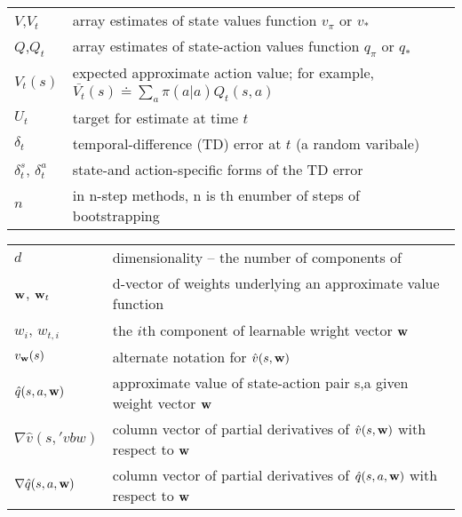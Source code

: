 \documentclass[10pt, landscape, a4paper]{article}
\begin{document}
\begin{multicols}{3}
        \begin{tabular}{ p{} p{} }
            $V$,$V_t$                  & array estimates of state values function $v_\pi$ or $v_*$                                      \\
            $Q$,$Q_t$                  & array estimates of state-action values function $q_\pi$ or $q_*$                               \\
            $V_t(s)$                   & expected approximate action value; for example, $\bar{V_t}(s)\doteq \sum_{a} \pi(a|a)Q_t(s,a)$ \\
            $U_t$                      & target for estimate at time $t$                                                                \\
            $\delta_t$                 & temporal-difference (TD) error at $t$ (a random varibale)                                      \\
            $\delta_t^s$, $\delta_t^a$ & state-and action-specific forms of the TD error                                                \\
            $n$                        & in n-step methods, n is th enumber of steps of bootstrapping                                   \\
        \end{tabular}

        \begin{tabular}{ p{} p{} }
            $d$                          & dimensionality -- the number of components of                                          \\
            $\vb{w}$, $\vb{w}_t$         & d-vector of weights underlying an approximate value function                           \\
            $w_i$, $w_{t,i}$             & the $i$th component of learnable wright vector $\vb{w}$                                \\
            $v_{\vb{w}}(s)$              & alternate notation for $\hat{v}(s,\vb{w})$                                             \\
            $\hat{q}(s,a,\vb{w})$        & approximate value of state-action pair s,a given weight vector $\vb{w}$                \\
            $\nabla \hat{v}(s,'vb{w})$   & column vector of partial derivatives of $\hat{v}(s,\vb{w})$ with respect to $\vb{w}$   \\
            $\nabla \hat{q}(s,a,\vb{w})$ & column vector of partial derivatives of $\hat{q}(s,a,\vb{w})$ with respect to $\vb{w}$ \\
        \end{tabular}


\end{multicols}
\end{document}
